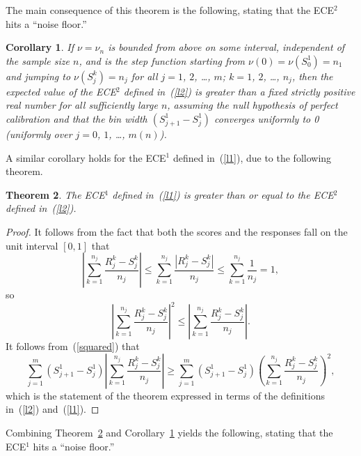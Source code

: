 \documentclass{article}
\newtheorem{theorem}{Theorem}[]
\newtheorem{corollary}[theorem]{Corollary}
\begin{document}
The main consequence of this theorem is the following,
stating that the ECE$^2$ hits a ``noise floor.''

\begin{corollary}
\label{l2co}
If $\nu = \nu_n$ is bounded from above on some interval,
independent of the sample size $n$,
and is the step function starting from $\nu(0) = \nu(S_0^1) = n_1$
and jumping to $\nu(S_j^k) = n_j$
for all $j = 1$, $2$, \dots, $m$; $k = 1$, $2$, \dots, $n_j$,
then the expected value of the ECE$^2$ defined in~(\ref{l2}) is greater
than a fixed strictly positive real number for all sufficiently large $n$,
assuming the null hypothesis of perfect calibration
and that the bin width $(S_{j+1}^1 - S_j^1)$ converges uniformly to 0
(uniformly over $j = 0$, $1$, \dots, $m(n)$).
\end{corollary}


A similar corollary holds for the ECE$^1$ defined in~(\ref{l1}),
due to the following theorem.

\begin{theorem}
\label{dominance}
The ECE$^1$ defined in~(\ref{l1}) is greater than or equal to the ECE$^2$
defined in~(\ref{l2}).
\end{theorem}

\begin{proof}
It follows from the fact that both the scores and the responses fall
on the unit interval $[0, 1]$ that
%
\begin{equation}
\left| \sum_{k=1}^{n_j} \frac{R_j^k - S_j^k}{n_j} \right|
\le \sum_{k=1}^{n_j} \frac{|R_j^k - S_j^k|}{n_j}
\le \sum_{k=1}^{n_j} \frac{1}{n_j} = 1,
\end{equation}
%
so
%
\begin{equation}
\label{squared}
\left| \sum_{k=1}^{n_j} \frac{R_j^k - S_j^k}{n_j} \right|^2
\le \left| \sum_{k=1}^{n_j} \frac{R_j^k - S_j^k}{n_j} \right|.
\end{equation}
%
It follows from~(\ref{squared}) that
%
\begin{equation}
\sum_{j=1}^m (S_{j+1}^1 - S_j^1)
\left| \sum_{k=1}^{n_j} \frac{R_j^k - S_j^k}{n_j} \right|
\ge \sum_{j=1}^m (S_{j+1}^1 - S_j^1)
\left( \sum_{k=1}^{n_j} \frac{R_j^k - S_j^k}{n_j} \right)^2,
\end{equation}
%
which is the statement of the theorem expressed in terms
of the definitions in~(\ref{l2}) and~(\ref{l1}).
\end{proof}

Combining Theorem~\ref{dominance} and Corollary~\ref{l2co}
yields the following, stating that the ECE$^1$ hits a ``noise floor.''
\end{document}
